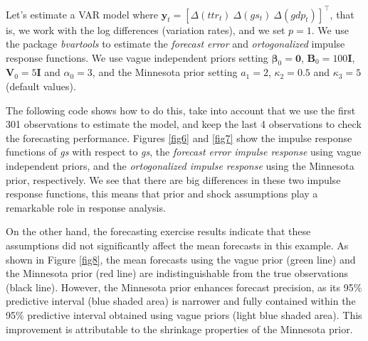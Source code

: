 Let's estimate a VAR model where $\bm{y}_t=[\Delta(ttr_t) \ \Delta(gs_t) \ \Delta(gdp_t)]^{\top}$, that is, we work with the log differences (variation rates), and we set $p=1$. We use the package \textit{bvartools} to estimate the \textit{forecast error} and \textit{ortogonalized} impulse response functions. We use vague independent priors setting $\bm{\beta}_0=\bm{0}$, $\bm{B}_0=100\bm{I}$, $\bm{V}_0=5\bm{I}$ and $\alpha_0=3$, and the Minnesota prior setting $a_1=2$, $\kappa_2=0.5$ and $\kappa_3=5$ (default values).


The following code shows how to do this, take into account that we use the first 301 observations to estimate the model, and keep the last 4 observations to check the forecasting performance. Figures \ref{fig6} and \ref{fig7} show the impulse response functions of \textit{gs} with respect to \textit{gs}, the \textit{forecast error impulse response} using vague independent priors, and the \textit{ortogonalized impulse response} using the Minnesota prior, respectively. We see that there are big differences in these two impulse response functions, this means that prior and shock assumptions play a remarkable role in response analysis. 

On the other hand, the forecasting exercise results indicate that these assumptions did not significantly affect the mean forecasts in this example. As shown in Figure \ref{fig8}, the mean forecasts using the vague prior (green line) and the Minnesota prior (red line) are indistinguishable from the true observations (black line). However, the Minnesota prior enhances forecast precision, as its 95\% predictive interval (blue shaded area) is narrower and fully contained within the 95\% predictive interval obtained using vague priors (light blue shaded area). This improvement is attributable to the shrinkage properties of the Minnesota prior.

